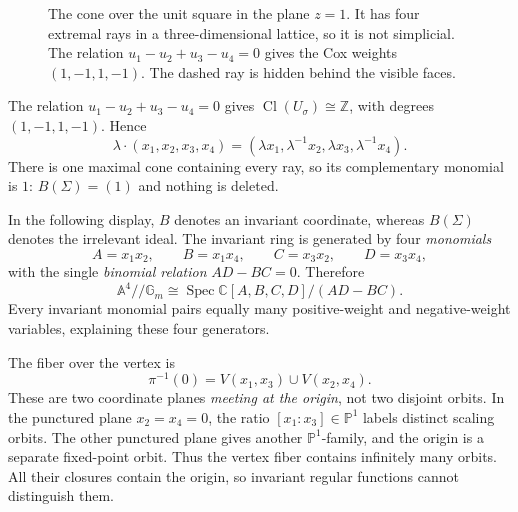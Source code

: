 \documentclass[11pt]{article}
\theoremstyle{definition}
\theoremstyle{remark}
\DeclareMathOperator{\Spec}{Spec}
\DeclareMathOperator{\Cl}{Cl}
\newcommand{\A}{\mathbb A}
\newcommand{\Pj}{\mathbb P}
\newcommand{\C}{\mathbb C}
\newcommand{\Z}{\mathbb Z}
\newcommand{\Gm}{\mathbb G_m}
\begin{document}
\begin{figure}[htbp]
\centering
{}
\caption{The cone over the unit square in the plane $z=1$.
It has four extremal rays in a three-dimensional lattice, so it is
not simplicial. The relation $u_1-u_2+u_3-u_4=0$ gives the Cox weights
$(1,-1,1,-1)$. The dashed ray is hidden behind the visible faces.}
\label{fig:nov02-square-cone}
\end{figure}

The relation \(u_1-u_2+u_3-u_4=0\) gives
\(\Cl(U_\sigma)\cong\Z\), with degrees \((1,-1,1,-1)\). Hence
\[
\lambda\cdot(x_1,x_2,x_3,x_4)
=(\lambda x_1,\lambda^{-1}x_2,
  \lambda x_3,\lambda^{-1}x_4).
\]
There is one maximal cone containing every ray, so its complementary
monomial is \(1\): \(B(\Sigma)=(1)\) and nothing is deleted.

In the following display, \(B\) denotes an invariant coordinate,
whereas \(B(\Sigma)\) denotes the irrelevant ideal.
The invariant ring is generated by four \emph{monomials}
\[
A=x_1x_2,\qquad B=x_1x_4,\qquad
C=x_3x_2,\qquad D=x_3x_4,
\]
with the single \emph{binomial relation} \(AD-BC=0\). Therefore
\[
\boxed{\A^4\mathbin{//}\Gm
\cong\Spec\C[A,B,C,D]/(AD-BC).}
\]
Every invariant monomial pairs equally many positive-weight and
negative-weight variables, explaining these four generators.

The fiber over the vertex is
\[
\pi^{-1}(0)=V(x_1,x_3)\cup V(x_2,x_4).
\]
These are two coordinate planes \emph{meeting at the origin}, not
two disjoint orbits. In the punctured plane \(x_2=x_4=0\), the ratio
\([x_1:x_3]\in\Pj^1\) labels distinct scaling orbits. The other
punctured plane gives another \(\Pj^1\)-family, and the origin is a
separate fixed-point orbit. Thus the vertex fiber contains infinitely
many orbits. All their closures contain the origin, so invariant
regular functions cannot distinguish them.
\end{document}
